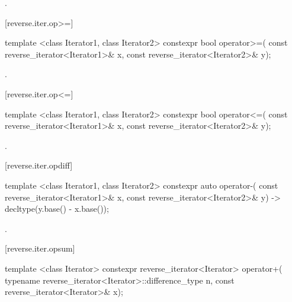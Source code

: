 \begin{itemdescr}
\pnum
\returns
{}.
\end{itemdescr}

[reverse.iter.op>=]{}

%
\begin{itemdecl}
template <class Iterator1, class Iterator2>
  constexpr bool operator>=(
    const reverse_iterator<Iterator1>& x,
    const reverse_iterator<Iterator2>& y);
\end{itemdecl}

\begin{itemdescr}
\pnum
\returns
{}.
\end{itemdescr}

[reverse.iter.op<=]{}

%
\begin{itemdecl}
template <class Iterator1, class Iterator2>
  constexpr bool operator<=(
    const reverse_iterator<Iterator1>& x,
    const reverse_iterator<Iterator2>& y);
\end{itemdecl}

\begin{itemdescr}
\pnum
\returns
{}.
\end{itemdescr}

[reverse.iter.opdiff]{}

%
\begin{itemdecl}
template <class Iterator1, class Iterator2>
    constexpr auto operator-(
    const reverse_iterator<Iterator1>& x,
    const reverse_iterator<Iterator2>& y) -> decltype(y.base() - x.base());
\end{itemdecl}

\begin{itemdescr}
\pnum
\returns
{}.
\end{itemdescr}

[reverse.iter.opsum]{}

%
\begin{itemdecl}
template <class Iterator>
  constexpr reverse_iterator<Iterator> operator+(
    typename reverse_iterator<Iterator>::difference_type n,
    const reverse_iterator<Iterator>& x);
\end{itemdecl}

